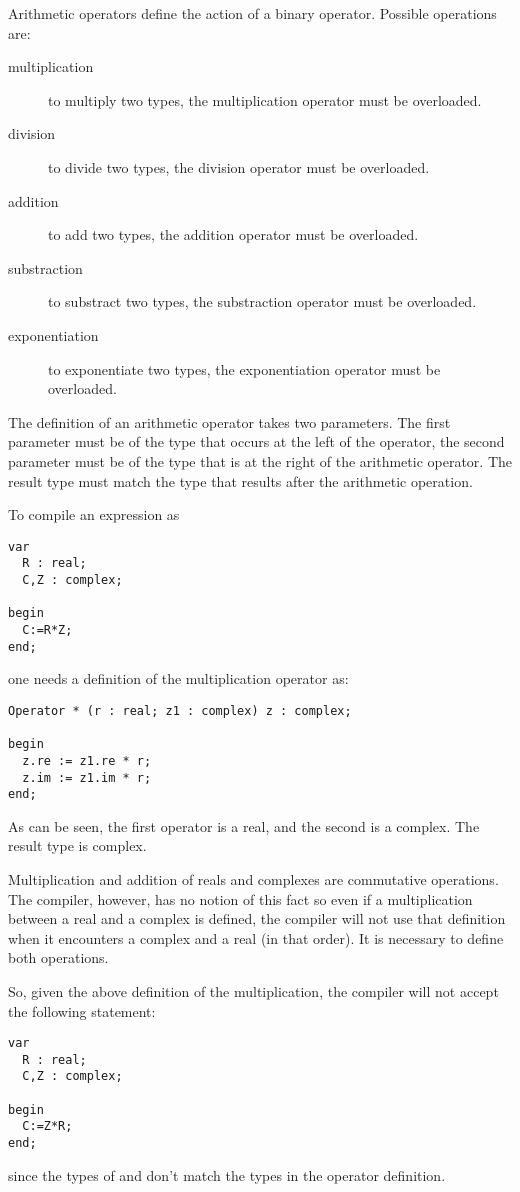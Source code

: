 Arithmetic operators define the action of a binary operator. Possible
operations are:
\begin{description}
\item[multiplication] to multiply two types, the \var{*} multiplication
operator must be overloaded.
\item[division] to divide two types, the \var{/} division
operator must be overloaded.
\item[addition] to add two types, the \var{+} addition
operator must be overloaded.
\item[substraction] to substract two types, the \var{-} substraction
operator must be overloaded.
\item[exponentiation] to exponentiate two types, the \var{**} exponentiation
operator must be overloaded.
\end{description}

The definition of an arithmetic operator takes two parameters. The first
parameter must be of the type that occurs at the left of the operator,
the second parameter must be of the type that is at the right of the
arithmetic operator. The result type must match the type that results
after the arithmetic operation.

To compile an expression as
\begin{verbatim}
var
  R : real;
  C,Z : complex;

begin
  C:=R*Z;
end;
\end{verbatim}
one needs a definition of the multiplication operator as:
\begin{verbatim}
Operator * (r : real; z1 : complex) z : complex;

begin
  z.re := z1.re * r;
  z.im := z1.im * r;
end;
\end{verbatim}
As can be seen, the first operator is a real, and the second is
a complex. The result type is complex.

Multiplication and addition of reals and complexes are commutative
operations. The compiler, however, has no notion of this fact so even
if a multiplication between a real and a complex is defined, the
compiler will not use that definition when it encounters a complex
and a real (in that order). It is necessary to define both operations.

So, given the above definition of the multiplication,
the compiler will not accept the following statement:
\begin{verbatim}
var
  R : real;
  C,Z : complex;

begin
  C:=Z*R;
end;
\end{verbatim}
since the types of  and  don't match the types in the
operator definition.

